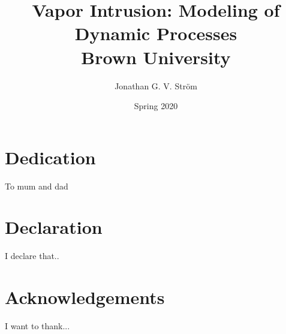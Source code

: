 \documentclass[12pt,twoside]{report}
\begin{document}
\title{
{Vapor Intrusion: Modeling of Dynamic Processes}\\ %
{\large Brown University}\\
}
\author{Jonathan G. V. Ström}
\date{Spring 2020}

\maketitle



\chapter*{Dedication}
To mum and dad

\chapter*{Declaration}
I declare that..

\chapter*{Acknowledgements}
I want to thank...

\tableofcontents{}



%
%
%
%
%

\appendix

\begin{comment}
Outline of the paper:

Introduction:
- Background/perspective on indoor air quality and VI
- Temporal & spatial variability in VI
- Overcoming variability
-- Techniques/methods; CPM, ITS, etc 

Methods:
Preferential pathways:
Classifying Transport:
Predicting ITS:
Sorption:
Future work:
\end{comment}
\end{document}
